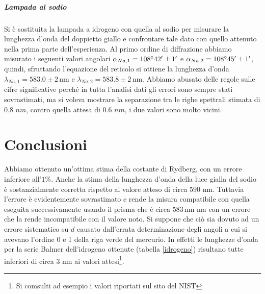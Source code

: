 \documentclass[10pt,a4paper]{article}
\begin{document}
\subparagraph{Lampada al sodio}
Si è sostituita la lampada a idrogeno con quella al sodio per misurare la lunghezza d'onda del doppietto giallo e confrontare tale dato con quello attenuto nella prima parte dell'esperienza. Al primo ordine di diffrazione abbiamo misurato i seguenti valori angolari $\alpha_{Na,1}= 108\degree 42'\pm 1' $ e $\alpha_{Na,2}=108\degree 45' \pm 1'$, quindi, sfruttando l'equazione del reticolo si ottiene la lunghezza d'onda $\lambda_{Na,1}=583.0 \pm 2 \,\mbox{nm}$ e $\lambda_{Na,2}=583.8 \pm 2 \,\mbox{nm}$.
Abbiamo abusato delle regole sulle cifre significative perché in tutta l'analisi dati gli errori sono sempre stati sovrastimati, ma si voleva mostrare la separazione tra le righe spettrali stimata di $0.8 \, \,nm$, contro quella attesa di $0.6 \, \,nm$, i due valori sono molto vicini.\\

\section{Conclusioni}
Abbiamo ottenuto un'ottima stima della costante di Rydberg, con un errore inferiore all'$1\%$. Anche la stima della lunghezza d'onda della luce gialla del sodio è sostanzialmente corretta rispetto al valore atteso di circa $590 \, \,\mbox{nm}$. Tuttavia l'errore è evidentemente sovrastimato e rende la misura  compatibile con quella eseguita successivamente usando il prisma che è circa $583\,\mbox{nm}$ ma con un errore che la rende incompatibile con il valore noto. Si suppone che ciò sia dovuto ad un errore sistematico su $d$ causato dall'errata determinazione degli angoli a cui si avevano l'ordine 0 e 1 della riga verde del mercurio. In effetti le lunghezze d'onda per la serie Balmer dell'idrogeno ottenute (tabella \ref{idrogeno}) risultano tutte inferiori di circa 3 nm ai valori attesi\footnote{Si comsulti ad esempio i valori riportati sul sito del NIST}.\\
\end{document}
